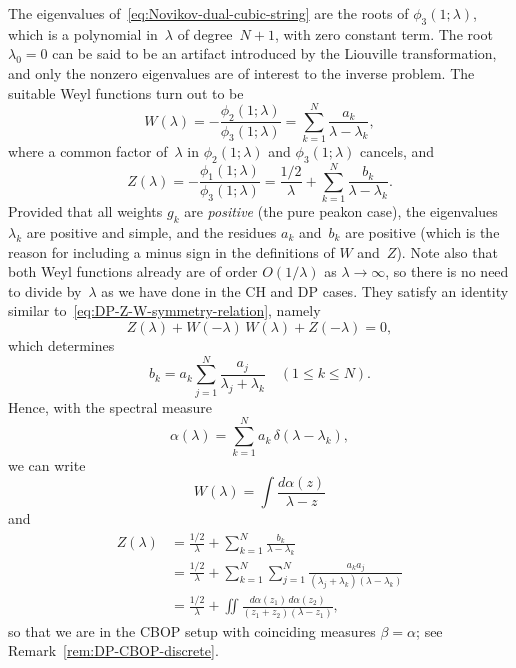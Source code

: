 \documentclass[10pt,a4paper]{article} \pdfoutput=1 
\begin{document}
The eigenvalues of~\eqref{eq:Novikov-dual-cubic-string} are the roots
of $\phi_3(1;\lambda)$, which is a polynomial in~$\lambda$ of degree~$N+1$,
with zero constant term. The root $\lambda_0=0$ can be said to be an artifact
introduced by the Liouville transformation, and only the nonzero eigenvalues
are of interest to the inverse problem.
The suitable Weyl functions turn out to be
\begin{equation}
  W(\lambda)
  = - \frac{\phi_2(1;\lambda)}{\phi_3(1;\lambda)}
  = \sum_{k=1}^N \frac{a_k}{\lambda-\lambda_k}
  ,
\end{equation}
where a common factor of~$\lambda$ in $\phi_2(1;\lambda)$ and $\phi_3(1;\lambda)$ cancels,
and
\begin{equation}
  Z(\lambda)
  = - \frac{\phi_1(1;\lambda)}{\phi_3(1;\lambda)}
  = \frac{1/2}{\lambda} + \sum_{k=1}^N \frac{b_k}{\lambda-\lambda_k}
  .
\end{equation}
Provided that all weights $g_k$ are \emph{positive} (the pure peakon case),
the eigenvalues $\lambda_k$ are positive and simple,
and the residues $a_k$ and~$b_k$ are positive (which is the reason for including
a minus sign in the definitions of $W$ and~$Z$).
Note also that both Weyl functions already are of order $O(1/\lambda)$ as $\lambda \to \infty$,
so there is no need to divide by~$\lambda$ as we have done in the CH and DP cases.
They satisfy an identity similar to~\eqref{eq:DP-Z-W-symmetry-relation}, namely
\begin{equation}
  \label{eq:Novikov-Z-W-symmetry-relation}
  Z(\lambda) + W(-\lambda) \, W(\lambda) + Z(-\lambda) = 0,
\end{equation}
which determines
\begin{equation}
  \label{eq:Novikov-bk}
  b_k = a_k \sum_{j=1}^N \frac{a_j}{\lambda_j+\lambda_k}
  \quad (1 \le k \le N)
  .
\end{equation}
Hence, with the spectral measure
\begin{equation}
  \label{eq:Novikov-measure-alpha}
  \alpha(\lambda)
  = \sum_{k=1}^N a_k \, \delta(\lambda-\lambda_k)
  ,
\end{equation}
we can write
\begin{equation}
  \label{eq:Novikov-W-stieltjes-transform}
  W(\lambda)
  = \int \frac{d\alpha(z)}{\lambda-z}
\end{equation}
and
\begin{equation}
  \label{eq:Novikov-Z-stieltjes-transform}
  \begin{split}
    Z(\lambda)
    &
    = \frac{1/2}{\lambda} + \sum_{k=1}^N \frac{b_k}{\lambda - \lambda_k}
    \\ &
    = \frac{1/2}{\lambda} + \sum_{k=1}^N \sum_{j=1}^N \frac{a_k a_j}{(\lambda_j + \lambda_k) (\lambda - \lambda_k)}
    \\ &
    = \frac{1/2}{\lambda} + \iint \frac{d\alpha(z_1) \, d\alpha(z_2)}{(z_1+z_2)(\lambda-z_1)}
    ,
  \end{split}
\end{equation}
so that we are in the CBOP setup with coinciding measures $\beta=\alpha$;
see Remark~\ref{rem:DP-CBOP-discrete}.
\end{document}
